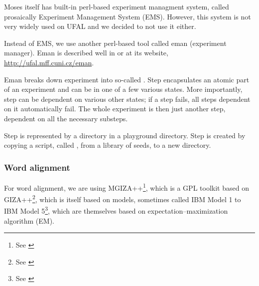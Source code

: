 Moses itself has built-in perl-based experiment managment system, called prosaically Experiment Management System (EMS). However, this system is not very widely used on UFAL and we decided to not use it either.

Instead of EMS, we use another perl-based tool called eman (experiment manager). Eman is described well in \cite{eman} or at its website, \url{http://ufal.mff.cuni.cz/eman}.  

Eman breaks down experiment into so-called . Step encapsulates an atomic part of an experiment and can be in one of a few various states. More importantly, step can be dependent on various other states; if a step fails, all steps dependent on it automatically fail. The whole experiment is then just another step, dependent on all the necessary substeps.

Step is represented by a directory in a playground directory. Step is created by copying a script, called , from a library of seeds, to a new directory.





\subsubsection{Word alignment}
For word alignment, we are using MGIZA++\footnote{See \cite{mgiza}}, which is a GPL toolkit based on GIZA++\footnote{See \cite{giza}}, which is itself based on models, sometimes called IBM Model 1 to IBM Model 5\footnote{See \cite{ibm}}, which are themselves based on expectation–maximization algorithm (EM).

